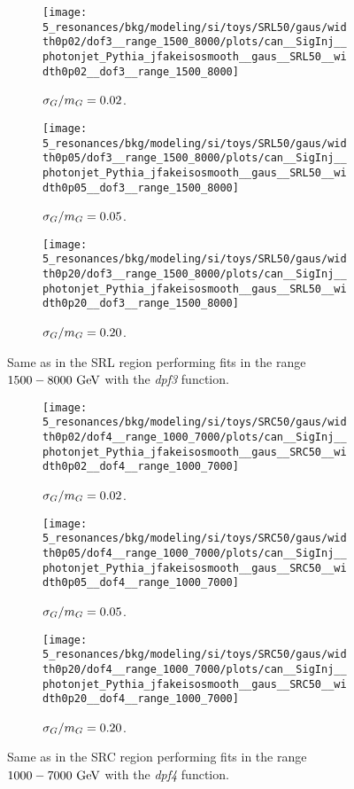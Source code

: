 \begin{figure}[ht!]
    \centering
    \begin{subfigure}[h]{0.32\linewidth}
        \centering
        \texttt{[image: 5\_resonances/bkg/modeling/si/toys/SRL50/gaus/width0p02/dof3\_\_range\_1500\_8000/plots/can\_\_SigInj\_\_photonjet\_Pythia\_jfakeisosmooth\_\_gaus\_\_SRL50\_\_width0p02\_\_dof3\_\_range\_1500\_8000]}
        \caption{\(\sigma_G/m_{G} = 0.02\).}
    \end{subfigure}
    \hfill
    \begin{subfigure}[h]{0.32\linewidth}
        \centering
        \texttt{[image: 5\_resonances/bkg/modeling/si/toys/SRL50/gaus/width0p05/dof3\_\_range\_1500\_8000/plots/can\_\_SigInj\_\_photonjet\_Pythia\_jfakeisosmooth\_\_gaus\_\_SRL50\_\_width0p05\_\_dof3\_\_range\_1500\_8000]}
        \caption{\(\sigma_G/m_{G} = 0.05\).}
    \end{subfigure}
    \hfill
    \begin{subfigure}[h]{0.32\linewidth}
        \centering
        \texttt{[image: 5\_resonances/bkg/modeling/si/toys/SRL50/gaus/width0p20/dof3\_\_range\_1500\_8000/plots/can\_\_SigInj\_\_photonjet\_Pythia\_jfakeisosmooth\_\_gaus\_\_SRL50\_\_width0p20\_\_dof3\_\_range\_1500\_8000]}
        \caption{\(\sigma_G/m_{G} = 0.20\).}
    \end{subfigure}
    \caption{Same as \Fig{\ref{fig:si_results:siginj_gaus_SR}} in the SRL region performing fits in the range \(1500-8000~\text{GeV}\) with the \textit{dpf3} function.}
    \label{fig:si_results:siginj_gaus_SRL}
\end{figure}

\begin{figure}[ht!]
    \centering
    \begin{subfigure}[h]{0.32\linewidth}
        \centering
        \texttt{[image: 5\_resonances/bkg/modeling/si/toys/SRC50/gaus/width0p02/dof4\_\_range\_1000\_7000/plots/can\_\_SigInj\_\_photonjet\_Pythia\_jfakeisosmooth\_\_gaus\_\_SRC50\_\_width0p02\_\_dof4\_\_range\_1000\_7000]}
        \caption{\(\sigma_G/m_{G} = 0.02\).}
    \end{subfigure}
    \hfill
    \begin{subfigure}[h]{0.32\linewidth}
        \centering
        \texttt{[image: 5\_resonances/bkg/modeling/si/toys/SRC50/gaus/width0p05/dof4\_\_range\_1000\_7000/plots/can\_\_SigInj\_\_photonjet\_Pythia\_jfakeisosmooth\_\_gaus\_\_SRC50\_\_width0p05\_\_dof4\_\_range\_1000\_7000]}
        \caption{\(\sigma_G/m_{G} = 0.05\).}
    \end{subfigure}
    \hfill
    \begin{subfigure}[h]{0.32\linewidth}
        \centering
        \texttt{[image: 5\_resonances/bkg/modeling/si/toys/SRC50/gaus/width0p20/dof4\_\_range\_1000\_7000/plots/can\_\_SigInj\_\_photonjet\_Pythia\_jfakeisosmooth\_\_gaus\_\_SRC50\_\_width0p20\_\_dof4\_\_range\_1000\_7000]}
        \caption{\(\sigma_G/m_{G} = 0.20\).}
    \end{subfigure}
    \caption{Same as \Fig{\ref{fig:si_results:siginj_gaus_SR}} in the SRC region performing fits in the range \(1000-7000~\text{GeV}\) with the \textit{dpf4} function.}
    \label{fig:si_results:siginj_gaus_SRC}
\end{figure}

